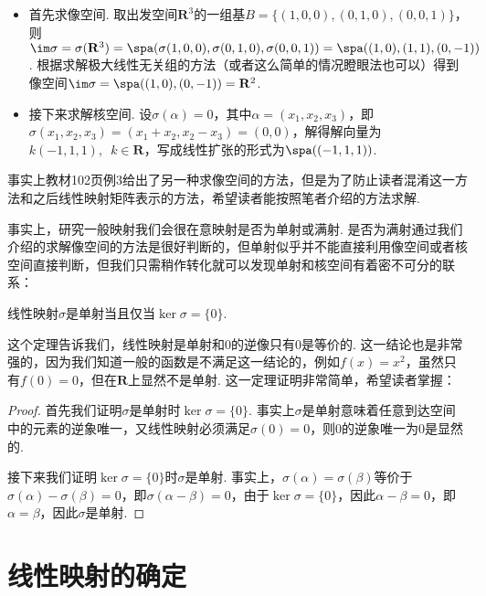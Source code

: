 \begin{solution}
    \begin{itemize}
        \item 首先求像空间. 取出发空间$\mathbf{R}^3$的一组基$B=\{(1,0,0),(0,1,0),(0,0,1)\}$，则$\im \sigma=\sigma(\mathbf{R}^3)=\spa(\sigma(1,0,0),\sigma(0,1,0),\sigma(0,0,1))=\spa((1,0),(1,1),(0,-1))$. 根据求解极大线性无关组的方法（或者这么简单的情况瞪眼法也可以）得到像空间$\im \sigma=\spa((1,0),(0,-1))=\mathbf{R}^2$.

        \item 接下来求解核空间. 设$\sigma(\alpha)=0$，其中$\alpha=(x_1,x_2,x_3)$，即$\sigma(x_1,x_2,x_3)=(x_1+x_2,x_2-x_3)=(0,0)$，解得解向量为$k(-1,1,1),\enspace k\in\mathbf{R}$，写成线性扩张的形式为$\spa((-1,1,1))$.
    \end{itemize}
\end{solution}

事实上教材102页例3给出了另一种求像空间的方法，但是为了防止读者混淆这一方法和之后线性映射矩阵表示的方法，希望读者能按照笔者介绍的方法求解.

事实上，研究一般映射我们会很在意映射是否为单射或满射. 是否为满射通过我们介绍的求解像空间的方法是很好判断的，但单射似乎并不能直接利用像空间或者核空间直接判断，但我们只需稍作转化就可以发现单射和核空间有着密不可分的联系：
\begin{theorem}\label{thm:5:单射与核空间}
    线性映射$\sigma$是单射当且仅当$\ker \sigma=\{0\}$.
\end{theorem}
这个定理告诉我们，线性映射是单射和0的逆像只有0是等价的. 这一结论也是非常强的，因为我们知道一般的函数是不满足这一结论的，例如$f(x)=x^2$，虽然只有$f(0)=0$，但在$\mathbf{R}$上显然不是单射. 这一定理证明非常简单，希望读者掌握：

\begin{proof}
    首先我们证明$\sigma$是单射时$\ker\sigma=\{0\}$. 事实上$\sigma$是单射意味着任意到达空间中的元素的逆象唯一，又线性映射必须满足$\sigma(0)=0$，则0的逆象唯一为0是显然的.

    接下来我们证明$\ker \sigma=\{0\}$时$\sigma$是单射. 事实上，$\sigma(\alpha)=\sigma(\beta)$等价于$\sigma(\alpha)-\sigma(\beta)=0$，即$\sigma(\alpha-\beta)=0$，由于$\ker \sigma=\{0\}$，因此$\alpha-\beta=0$，即$\alpha=\beta$，因此$\sigma$是单射.
\end{proof}

\section{线性映射的确定}

